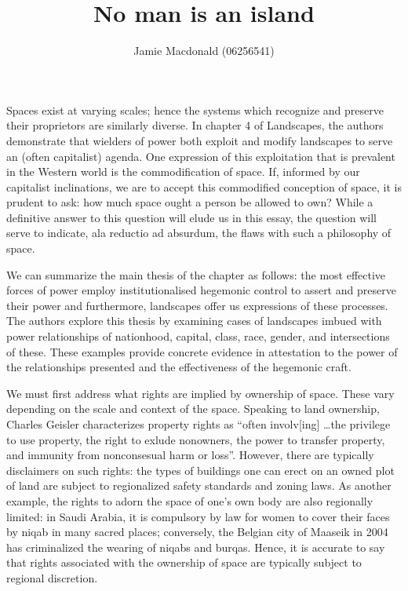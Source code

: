 \documentclass[12pt, letterpaper, oneside]{article}
\title{No man is an island}
\author{Jamie Macdonald (06256541)}
\begin{document}
\maketitle
Spaces exist at varying scales; hence the systems which recognize and preserve their proprietors are similarly diverse. In chapter 4 of Landscapes, the authors demonstrate that wielders of power both exploit and modify landscapes to serve an (often capitalist) agenda. One expression of this exploitation that is prevalent in the Western world is the commodification of space. If, informed by our capitalist inclinations, we are to accept this commodified conception of space, it is prudent to ask: how much space ought a person be allowed to own? While a definitive answer to this question will elude us in this essay, the question will serve to indicate, ala reductio ad absurdum, the flaws with such a philosophy of space.

We can summarize the main thesis of the chapter as follows: the most effective forces of power employ institutionalised hegemonic control to assert and preserve their power and furthermore, landscapes offer us expressions of these processes. The authors explore this thesis by examining cases of landscapes imbued with power relationships of nationhood, capital, class, race, gender, and intersections of these. These examples provide concrete evidence in attestation to the power of the relationships presented and the effectiveness of the hegemonic craft.

We must first address what rights are implied by ownership of space. These vary depending on the scale and context of the space. Speaking to land ownership, Charles Geisler characterizes property rights as ``often involv[ing] \ldots the privilege to use property, the right to exlude nonowners, the power to transfer property, and immunity from nonconsesual harm or loss''. However, there are typically disclaimers on such rights: the types of buildings one can erect on an owned plot of land are subject to regionalized safety standards and zoning laws.  As another example, the rights to adorn the space of one's own body are also regionally limited: in Saudi Arabia, it is compulsory by law for women to cover their faces by niqab in many sacred places; conversely, the Belgian city of Maaseik in 2004 has criminalized the wearing of niqabs and burqas. Hence, it is accurate to say that rights associated with the ownership of space are typically subject to regional discretion.
\end{document}
